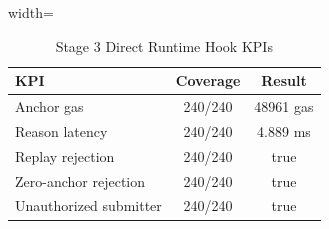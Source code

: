 \begin{table}[!t]
\centering
\caption{Stage 3 Direct Runtime Hook KPIs}
\label{tab:stage3}
\begin{adjustbox}{width=\columnwidth}
\begin{tabular}{lcc}
\toprule
KPI & Coverage & Result \\
\midrule
Anchor gas & 240/240 & 48961 gas \\
Reason latency & 240/240 & 4.889 ms \\
Replay rejection & 240/240 & true \\
Zero-anchor rejection & 240/240 & true \\
Unauthorized submitter & 240/240 & true \\
\bottomrule
\end{tabular}
\end{adjustbox}
\end{table}
